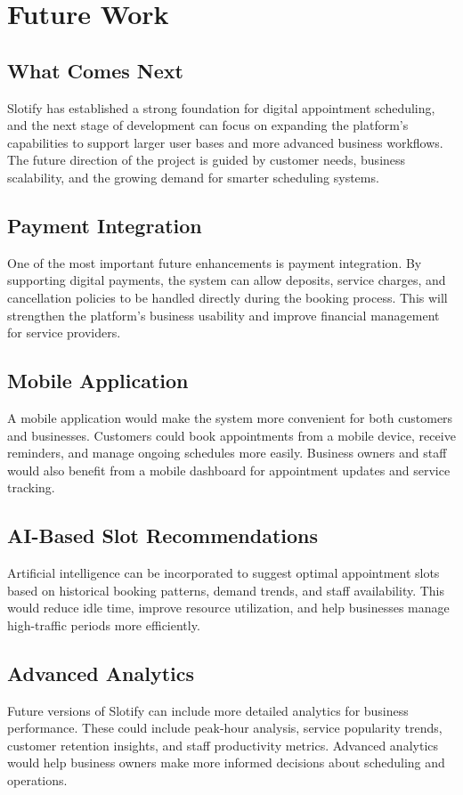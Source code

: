 \chapter{Future Work}

\section{What Comes Next}
Slotify has established a strong foundation for digital appointment scheduling, and the next stage of development can focus on expanding the platform's capabilities to support larger user bases and more advanced business workflows. The future direction of the project is guided by customer needs, business scalability, and the growing demand for smarter scheduling systems.

\section{Payment Integration}
One of the most important future enhancements is payment integration. By supporting digital payments, the system can allow deposits, service charges, and cancellation policies to be handled directly during the booking process. This will strengthen the platform's business usability and improve financial management for service providers.

\section{Mobile Application}
A mobile application would make the system more convenient for both customers and businesses. Customers could book appointments from a mobile device, receive reminders, and manage ongoing schedules more easily. Business owners and staff would also benefit from a mobile dashboard for appointment updates and service tracking.

\section{AI-Based Slot Recommendations}
Artificial intelligence can be incorporated to suggest optimal appointment slots based on historical booking patterns, demand trends, and staff availability. This would reduce idle time, improve resource utilization, and help businesses manage high-traffic periods more efficiently.

\section{Advanced Analytics}
Future versions of Slotify can include more detailed analytics for business performance. These could include peak-hour analysis, service popularity trends, customer retention insights, and staff productivity metrics. Advanced analytics would help business owners make more informed decisions about scheduling and operations.

